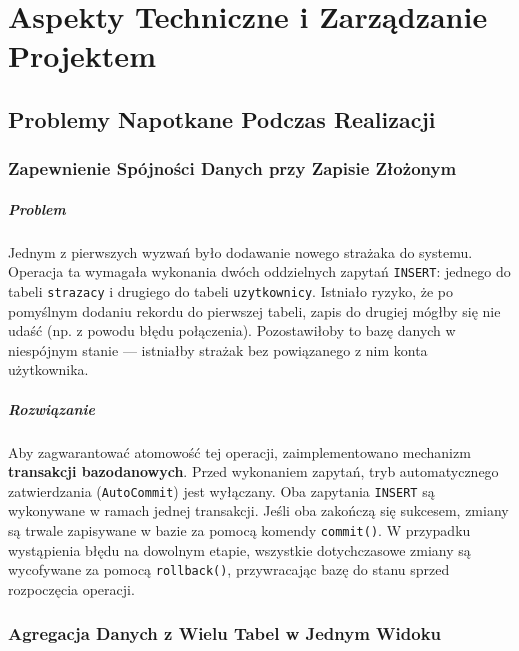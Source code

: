 \chapter{Aspekty Techniczne i Zarządzanie Projektem}
\label{chap:aspekty_techniczne}



\section*{Problemy Napotkane Podczas Realizacji}
\label{sec:problemy}

\subsection*{Zapewnienie Spójności Danych przy Zapisie Złożonym}
\label{ssec:problem_transakcje}

\paragraph*{Problem} Jednym z pierwszych wyzwań było dodawanie nowego strażaka do systemu. Operacja ta wymagała wykonania dwóch oddzielnych zapytań \texttt{INSERT}: jednego do tabeli \texttt{strazacy} i drugiego do tabeli \texttt{uzytkownicy}. Istniało ryzyko, że po pomyślnym dodaniu rekordu do pierwszej tabeli, zapis do drugiej mógłby się nie udaść (np. z powodu błędu połączenia). Pozostawiłoby to bazę danych w niespójnym stanie — istniałby strażak bez powiązanego z nim konta użytkownika.

\paragraph*{Rozwiązanie} Aby zagwarantować atomowość tej operacji, zaimplementowano mechanizm \textbf{transakcji bazodanowych}. Przed wykonaniem zapytań, tryb automatycznego zatwierdzania (\texttt{AutoCommit}) jest wyłączany. Oba zapytania \texttt{INSERT} są wykonywane w ramach jednej transakcji. Jeśli oba zakończą się sukcesem, zmiany są trwale zapisywane w bazie za pomocą komendy \texttt{commit()}. W przypadku wystąpienia błędu na dowolnym etapie, wszystkie dotychczasowe zmiany są wycofywane za pomocą \texttt{rollback()}, przywracając bazę do stanu sprzed rozpoczęcia operacji.

\subsection*{Agregacja Danych z Wielu Tabel w Jednym Widoku}
\label{ssec:problem_agregacja}

